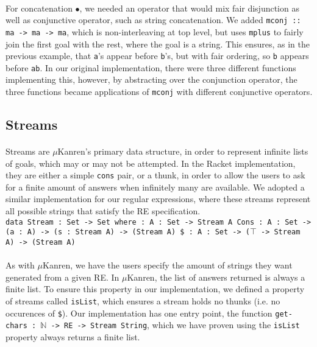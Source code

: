 \documentclass[12pt]{article}
\newcommand{\N}{\mathbb{N}}
\begin{document}
\paragraph{} For concatenation $\bullet$, we needed an operator that would mix fair disjunction as well as conjunctive operator, such as string concatenation. We added \texttt{mconj :: ma -> ma -> ma}, which is non-interleaving at top level, but uses \texttt{mplus} to fairly join the first goal with the rest, where the goal is a string. This ensures, as in the previous example, that \texttt{a}'s appear before \texttt{b}'s, but with fair ordering, so \texttt{b} appears before \texttt{ab}. In our original implementation, there were three different functions implementing this, however, by abstracting over the conjunction operator, the three functions became applications of \texttt{mconj} with different conjunctive operators.    

\subsection{Streams}
\paragraph{} Streams are $\mu$Kanren's primary data structure, in order to represent infinite lists of goals, which may or may not be attempted. In the Racket implementation, they are either a simple \texttt{cons} pair, or a thunk, in order to allow the users to ask for a finite amount of answers when infinitely many are available. We adopted a similar implementation for our regular expressions, where these streams represent all possible strings that satisfy the RE specification. \newline \\
\texttt{data Stream : Set -> Set where \newline
   \indent []   : {A : Set} -> Stream A \newline
   \indent Cons : {A : Set} -> (a : A) -> (s : Stream A) -> (Stream A) \newline
   \indent \$    : {A : Set} -> ($\top$ -> Stream A) -> (Stream A)} 
\paragraph{}
As with $\mu$Kanren, we have the users specify the amount of strings they want generated from a given RE. In $\mu$Kanren, the list of answers returned is always a finite list. To ensure this property in our implementation, we defined a property of streams called \texttt{isList}, which ensures a stream holds no thunks (i.e. no occurences of \texttt{\$}). Our implementation has one entry point, the function \texttt{get-chars : $\N$ -> RE -> Stream String}, which we have proven using the \texttt{isList} property always returns a finite list.
\end{document}
